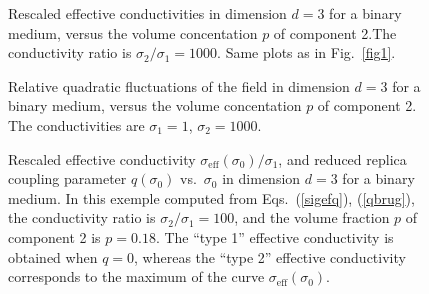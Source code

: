 \begin{figure}
\narrowtext
\vspace*{0.0cm}
\centerline{
}
\vspace*{0.3cm}
\caption{Rescaled effective conductivities in dimension $d=3$ 
for a binary medium, versus the volume concentation $p$ of 
component 2.The conductivity ratio is $\sigma_2/\sigma_1=1000$.
Same plots as in Fig.\ \ref{fig1}.
}
\label{fig4}
\end{figure}

\begin{figure}
\narrowtext
\vspace*{0.0cm}
\centerline{
}
\vspace*{0.3cm}
\caption{Relative quadratic fluctuations of the field in dimension
$d=3$ for a binary medium, versus the volume concentation $p$ of
component 2. The conductivities are $\sigma_1=1$, $\sigma_2=1000$.
}
\label{fig5}
\end{figure}

\begin{figure}
\narrowtext
\vspace*{0.0cm}
\centerline{
}
\vspace*{0.3cm}
\caption{Rescaled effective conductivity 
$\sigma_{\text{eff}}(\sigma_0)/\sigma_1$, and reduced
replica coupling parameter $q(\sigma_0)$ vs.\ $\sigma_0$ in
dimension $d=3$ for a binary medium. In this exemple computed 
from Eqs.\ (\ref{sigefq}), (\ref{qbrug}), the conductivity ratio is 
$\sigma_2/\sigma_1=100$, and the volume fraction $p$ of 
component 2 is $p=0.18$. The ``type 1'' effective conductivity is
obtained when $q=0$, whereas the ``type 2'' effective conductivity
corresponds to the maximum of the curve $\sigma_{\text{eff}}(\sigma_0)$.
}
\label{fig6}
\end{figure}


